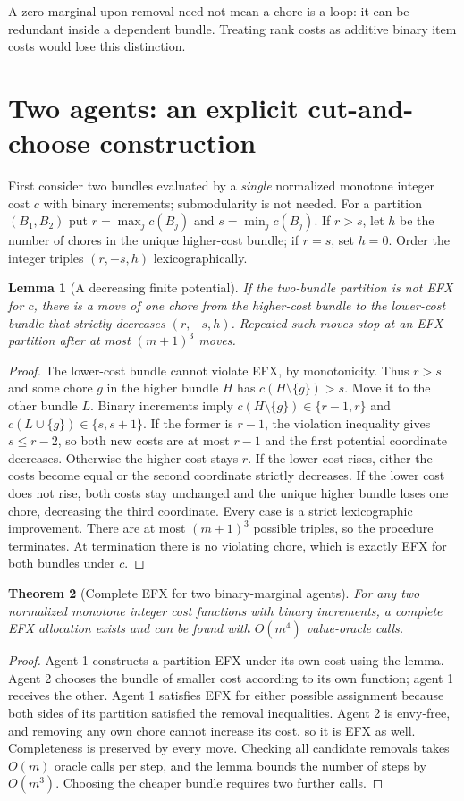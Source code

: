 \documentclass[11pt,a4paper]{article}
\newtheorem{theorem}{Theorem}[section]
\newtheorem{lemma}[theorem]{Lemma}
\theoremstyle{definition}
\theoremstyle{remark}
\begin{document}
A zero marginal upon removal need not mean a chore is a loop: it can be redundant inside a dependent bundle. Treating rank costs as additive binary item costs would lose this distinction.

\section{Two agents: an explicit cut-and-choose construction}
First consider two bundles evaluated by a \emph{single} normalized monotone integer cost $c$ with binary increments; submodularity is not needed. For a partition $(B_1,B_2)$ put $r=\max_j c(B_j)$ and $s=\min_j c(B_j)$. If $r>s$, let $h$ be the number of chores in the unique higher-cost bundle; if $r=s$, set $h=0$. Order the integer triples $(r,-s,h)$ lexicographically.

\begin{lemma}[A decreasing finite potential]
If the two-bundle partition is not EFX for $c$, there is a move of one chore from the higher-cost bundle to the lower-cost bundle that strictly decreases $(r,-s,h)$. Repeated such moves stop at an EFX partition after at most $(m+1)^3$ moves.
\end{lemma}
\begin{proof}
The lower-cost bundle cannot violate EFX, by monotonicity. Thus $r>s$ and some chore $g$ in the higher bundle $H$ has $c(H\setminus\{g\})>s$. Move it to the other bundle $L$. Binary increments imply
$c(H\setminus\{g\})\in\{r-1,r\}$ and $c(L\cup\{g\})\in\{s,s+1\}$.
If the former is $r-1$, the violation inequality gives $s\leq r-2$, so both new costs are at most $r-1$ and the first potential coordinate decreases. Otherwise the higher cost stays $r$. If the lower cost rises, either the costs become equal or the second coordinate strictly decreases. If the lower cost does not rise, both costs stay unchanged and the unique higher bundle loses one chore, decreasing the third coordinate. Every case is a strict lexicographic improvement. There are at most $(m+1)^3$ possible triples, so the procedure terminates. At termination there is no violating chore, which is exactly EFX for both bundles under $c$.
\end{proof}

\begin{theorem}[Complete EFX for two binary-marginal agents]
For any two normalized monotone integer cost functions with binary increments, a complete EFX allocation exists and can be found with $O(m^4)$ value-oracle calls.
\end{theorem}
\begin{proof}
Agent 1 constructs a partition EFX under its own cost using the lemma. Agent 2 chooses the bundle of smaller cost according to its own function; agent 1 receives the other. Agent 1 satisfies EFX for either possible assignment because both sides of its partition satisfied the removal inequalities. Agent 2 is envy-free, and removing any own chore cannot increase its cost, so it is EFX as well. Completeness is preserved by every move. Checking all candidate removals takes $O(m)$ oracle calls per step, and the lemma bounds the number of steps by $O(m^3)$. Choosing the cheaper bundle requires two further calls.
\end{proof}
\end{document}
